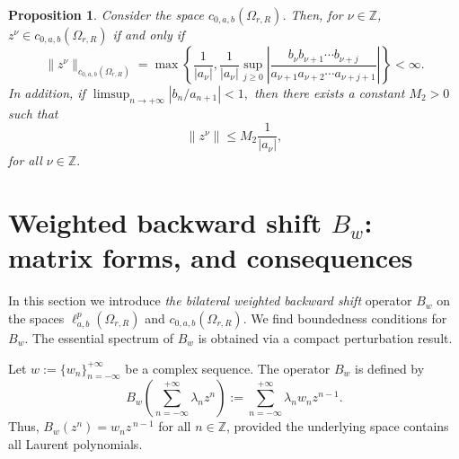 \documentclass[12pt, reqno]{amsart}
\newtheorem{proposition}[theorem]{Proposition}
\theoremstyle{definition}
\theoremstyle{remark}
\numberwithin{equation}{section}
\begin{document}
 \begin{proposition}
     Consider the space $c_{0,a,b}(\Omega_{r,R})$. Then, for $\nu \in \mathbb{Z}$, $z^{\nu}\in c_{0,a,b}(\Omega_{r,R})$ if and only if
\begin{equation*}
 \lVert  z^{\nu}  \rVert_{c_{0,a,b}(\Omega_{r,R})} = \max \left \{\frac{1}{|a_\nu|},\frac{1}{\lvert a_{\nu}\rvert}\sup_{j\geq 0}
\left|
\frac{b_{\nu}b_{\nu+1}\cdots b_{\nu+j}}{a_{\nu+1}a_{\nu+2}\cdots a_{\nu+j+1}}
\right|\right \}<\infty.
 \end{equation*}
 In addition, if $\limsup_{ n\rightarrow +\infty} \left\lvert b_n/a_{n+1}\right\rvert<1,$  then there exists a constant $M_{2}>0$ such that
   \begin{equation*}
   \lVert z^{\nu}\rVert\leq M_{2}\frac{1}{|a_{\nu}|},
   \end{equation*}
   for all $\nu \in \mathbb{Z}.$ 
 \end{proposition}
\section{Weighted backward shift $B_w$: matrix forms, and consequences}

  In this section we introduce \textit{the bilateral weighted backward shift} operator $B_w$ on the spaces $\ell^{p}_{a,b}(\Omega_{r,R})$ and $c_{0,a,b}(\Omega_{r,R})$. We find boundedness conditions for $B_w$. The essential spectrum of $B_w$ is obtained via a compact perturbation result. 

 Let $w:=\{w_n\}_{n=-\infty}^{+\infty}$ be a complex sequence. The operator $B_w$ is defined by 
 \[
 B_w(\sum_{n=-\infty}^{+\infty}\lambda_nz^n):=\sum_{n=-\infty}^{+\infty}\lambda_nw_nz^{n-1}.
 \]
Thus, \(B_w(z^n)=w_n z^{\,n-1}\) for all \(n\in\mathbb{Z}\), provided the underlying space contains all Laurent polynomials.
\end{document}
